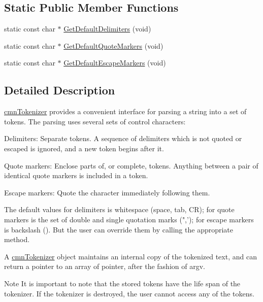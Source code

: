 \subsection*{Static Public Member Functions}
\begin{DoxyCompactItemize}
\item 
static const char $\ast$ \hyperlink{classcmn_tokenizer_aecd698f78bea30e2aa945378510080d9}{Get\-Default\-Delimiters} (void)
\item 
static const char $\ast$ \hyperlink{classcmn_tokenizer_af5f444c9daae22083ecbbd28c3646425}{Get\-Default\-Quote\-Markers} (void)
\item 
static const char $\ast$ \hyperlink{classcmn_tokenizer_aa9bdfbc4257afa5cab0793bb56823378}{Get\-Default\-Escape\-Markers} (void)
\end{DoxyCompactItemize}


\subsection{Detailed Description}
\hyperlink{classcmn_tokenizer}{cmn\-Tokenizer} provides a convenient interface for parsing a string into a set of tokens. The parsing uses several sets of control characters\-:

Delimiters\-: Separate tokens. A sequence of delimiters which is not quoted or escaped is ignored, and a new token begins after it.

Quote markers\-: Enclose parts of, or complete, tokens. Anything between a pair of identical quote markers is included in a token.

Escape markers\-: Quote the character immediately following them.

The default values for delimiters is whitespace (space, tab, C\-R); for quote markers is the set of double and single quotation marks (",'); for escape markers is backslash (). But the user can override them by calling the appropriate method.

A \hyperlink{classcmn_tokenizer}{cmn\-Tokenizer} object maintains an internal copy of the tokenized text, and can return a pointer to an array of pointer, after the fashion of argv.

\begin{DoxyNote}{Note}
It is important to note that the stored tokens have the life span of the tokenizer. If the tokenizer is destroyed, the user cannot access any of the tokens. 
\end{DoxyNote}


